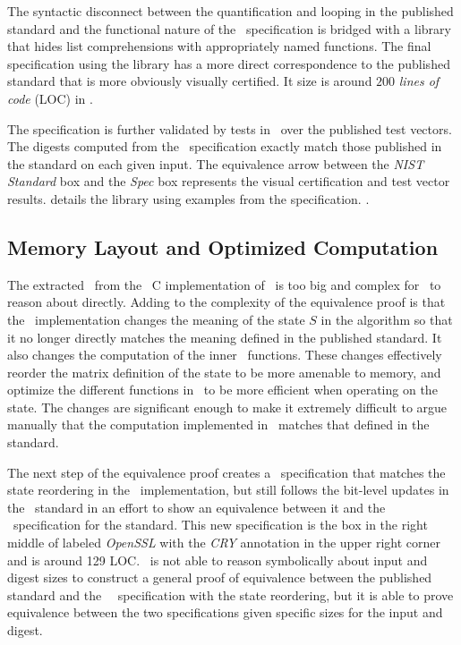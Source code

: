 The syntactic disconnect between the quantification and looping in the published standard and the functional nature of the \cryptol\ specification is bridged with a library that hides list comprehensions with appropriately named functions.
The final specification using the library has a more direct correspondence to the published standard that is more obviously visually certified.
It size is around $200$ \emph{lines of code} (LOC) in \cryptol.

The specification is further validated by tests in \cryptol\ over the published test vectors.
The digests computed from the \cryptol\ specification exactly match those published in the standard on each given input.
The equivalence arrow between the \emph{NIST Standard} box and the \emph{Spec} box represents the visual certification and test vector results.
 details the library using examples from the specification. .

\subsection{Memory Layout and Optimized Computation}

The extracted \sawcore\ from the \openssl\ C implementation of \shaThree\ is too big and complex for \saw\ to reason about directly.
Adding to the complexity of the equivalence proof is that the \openssl\ implementation changes the meaning of the state $S$ in the algorithm so that it no longer directly matches the meaning defined in the published standard.
It also changes the computation of the inner \keccak\ functions.
These changes effectively reorder the matrix definition of the state to be more amenable to memory, and optimize the different functions in \keccak\ to be more efficient when operating on the state.
The changes are significant enough to make it extremely difficult to argue manually that the computation implemented in \openssl\ matches that defined in the standard.

The next step of the equivalence proof creates a \cryptol\ specification that matches the state reordering in the \openssl\ implementation, but still follows the bit-level updates in the \fips\ standard in an effort to show an equivalence between it and the \cryptol\ specification for the standard.
This new specification is the box in the right middle of  labeled \emph{OpenSSL} with the \emph{CRY} annotation in the upper right corner and is around 129 LOC. \saw\ is not able to reason symbolically about input and digest sizes to construct a general proof of equivalence between the published standard and the \openssl\ \cryptol\ specification with the state reordering, but it is able to prove equivalence between the two specifications given specific sizes for the input and digest.

